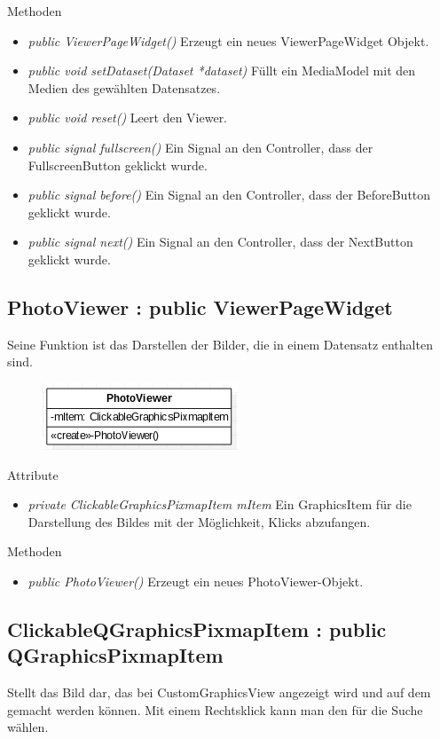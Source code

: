 \pagebreak
Methoden
\begin{itemize}
	\item\textit{public ViewerPageWidget()} 
	Erzeugt ein neues ViewerPageWidget Objekt.
	\item\textit{public void setDataset(Dataset *dataset)} 
	Füllt ein MediaModel mit den Medien des gewählten Datensatzes.
	\item\textit{public void reset()} 
	Leert den Viewer.
	\item\textit{public signal fullscreen()} 
	Ein Signal an den Controller, dass der FullscreenButton geklickt wurde.
	\item\textit{public signal before()} 
	Ein Signal an den Controller, dass der BeforeButton geklickt wurde.
	\item\textit{public signal next()}
	Ein Signal an den Controller, dass der NextButton geklickt wurde.
\end{itemize}

\subsection*{PhotoViewer : public ViewerPageWidget}
Seine Funktion ist das Darstellen der Bilder, die in einem Datensatz enthalten sind.

\begin{figure}[H]
	\centering
	\includegraphics[scale=0.5]{img/Klassendiagramm/Klassen/View/PhotoViewer}
	\label{fig:photoVIewer}
\end{figure}

Attribute
\begin{itemize}
	\item\textit{private ClickableGraphicsPixmapItem mItem} 
	Ein GraphicsItem für die Darstellung des Bildes mit der Möglichkeit, Klicks abzufangen.    
\end{itemize}

Methoden
\begin{itemize}
	\item\textit{public PhotoViewer()}
	 Erzeugt ein neues PhotoViewer-Objekt.
\end{itemize}

\subsection*{ClickableQGraphicsPixmapItem : public QGraphicsPixmapItem}
Stellt das Bild dar, das bei CustomGraphicsView angezeigt wird und auf dem  gemacht werden können. Mit einem Rechtsklick kann man den  für die Suche wählen.

